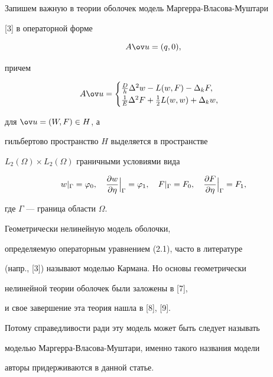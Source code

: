  


Запишем важную в теории оболочек модель Маргерра-Власова-Муштари 


[3] в операторной форме 


\begin{equation} 


A\ov u=(q,0), 


\end{equation} 


причем 


\begin{equation} 


A\ov u= 


\begin{cases} 


\frac{D}{h}\Delta^2w-L(w,F)-\Delta_kF,\\ 


\frac{1}{E}\Delta^2F+\frac{1}{2}L(w,w)+\Delta_kw,


\end{cases} 


\end{equation} 


для $\ov u=(W,F)\in H$, а 


гильбертово пространство $H$ выделяется в пространстве 


$L_2(\Omega)\times L_2(\Omega)$ граничными условиями вида 


\begin{equation} 


w|_\Gamma=\varphi_0,\quad 


\Bigl.\frac{\partial w}{\partial\eta}\Bigr|_\Gamma=\varphi_1,\quad 


F|_\Gamma=F_0,\quad 


\Bigl.\frac{\partial F}{\partial\eta}\Bigr|_\Gamma=F_1, 


\end{equation} 


где $\Gamma$ --- граница области $\Omega$. 


 


\begin{note} Геометрически нелинейную модель оболочки, 


определяемую операторным уравнением (2.1), часто в литературе 


(напр., [3]) называют моделью Кармана. Но основы геометрически 


нелинейной теории оболочек были заложены в [7], 


и свое завершение эта теория нашла в [8], [9]. 


Потому справедливости ради эту модель может быть следует называть 


моделью Маргерра-Власова-Муштари, именно такого названия модели 


авторы придерживаются в данной статье. 


\end{note} 


